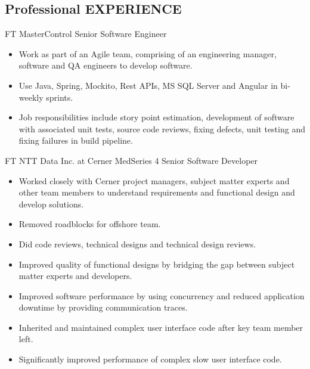 \documentclass[10pt]{article} %
\begin{document}
\begin{paracol}{2}

\section{Professional EXPERIENCE}




{FT} %
{MasterControl} %
{Senior Software Engineer} %
{} %
\begin{itemize}
	\setlength\itemsep{0em}
	\item Work as part of an Agile team, comprising of an engineering manager, software and QA engineers to develop software.
	\item Use Java, Spring, Mockito, Rest APIs, MS SQL Server and Angular in bi-weekly sprints.
	\item Job responsibilities include story point estimation, development of software with associated unit tests, source code reviews, fixing defects, unit testing and fixing failures in build pipeline.
\end{itemize}

{FT} %
{NTT Data Inc. at Cerner MedSeries 4} %
{Senior Software Developer} %
{}\begin{itemize}
	\setlength\itemsep{0em}
	\item Worked closely with Cerner project managers, subject matter experts and other team members to understand requirements and functional design and develop solutions. 
	\item Removed roadblocks for offshore team. 
	\item Did code reviews, technical designs and technical design reviews. 
	\item Improved quality of functional designs by bridging the gap between subject matter experts and developers.
	\item Improved software performance by using concurrency and reduced application downtime by providing communication traces.
	\item	Inherited and maintained complex user interface code after key team member left. 
	\item Significantly improved performance of complex slow user interface code. %
\end{itemize}
\switchcolumn %



\end{paracol}
\end{document}
